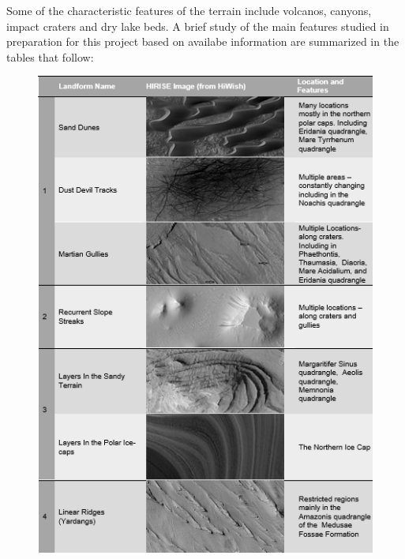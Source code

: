 \documentclass[project-plan]{report-template}
\begin{document}
 Some of the characteristic features of the terrain include volcanos, canyons, impact craters and dry lake beds. A brief study of the main features studied in preparation for this project based on availabe information are summarized in the tables that follow: \\

 \begin{figure}[htp]
    \begin{center}
        \includegraphics[width=1\textwidth]{table-1-part-1.png}
    \end{center}
\end{figure}
\end{document}

